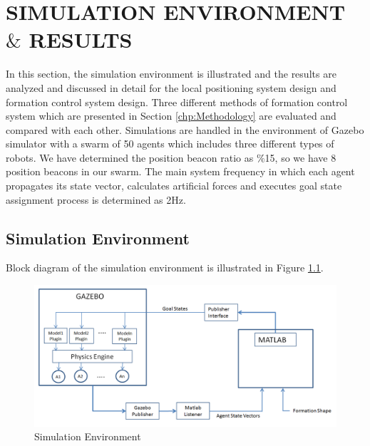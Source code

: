 

\chapter{SIMULATION ENVIRONMENT $\&$ RESULTS}
\label{chp:simulation}













In this section, the simulation environment is illustrated and the results are analyzed and discussed in detail for the local positioning system design and formation control system design. Three different methods of formation control system which are presented in Section \ref{chp:Methodology} are evaluated and compared with each other. Simulations are handled in the environment of Gazebo simulator with a swarm of 50 agents which includes three different types of robots. We have determined the position beacon ratio as $\%$15, so we have 8 position beacons in our swarm. The main system frequency in which each agent propagates its state vector, calculates artificial forces and executes goal state assignment process is determined as 2Hz. 
\newpage
\section{Simulation Environment}
Block diagram of the simulation environment is illustrated in Figure \ref{simulation_env_ref}.

\begin{figure}[H]
\caption{Simulation Environment} \label{simulation_env_ref}
\centering
\includegraphics[scale = 0.45]{environment}
\end{figure}
    
